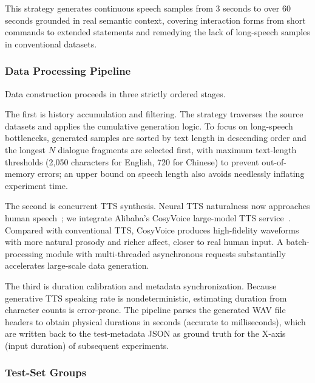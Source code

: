 \documentclass[a4paper,11pt]{article}
\begin{document}
This strategy generates continuous speech samples from 3 seconds to over 60 seconds grounded in real semantic context, covering interaction forms from short commands to extended statements and remedying the lack of long-speech samples in conventional datasets.

\subsubsection{Data Processing Pipeline}

Data construction proceeds in three strictly ordered stages.

The first is history accumulation and filtering. The strategy traverses the source datasets and applies the cumulative generation logic. To focus on long-speech bottlenecks, generated samples are sorted by text length in descending order and the longest $N$ dialogue fragments are selected first, with maximum text-length thresholds (2,050 characters for English, 720 for Chinese) to prevent out-of-memory errors; an upper bound on speech length also avoids needlessly inflating experiment time.

The second is concurrent TTS synthesis. Neural TTS naturalness now approaches human speech~\cite{ref16}; we integrate Alibaba's CosyVoice large-model TTS service~\cite{ref17}. Compared with conventional TTS, CosyVoice produces high-fidelity waveforms with more natural prosody and richer affect, closer to real human input. A batch-processing module with multi-threaded asynchronous requests substantially accelerates large-scale data generation.

The third is duration calibration and metadata synchronization. Because generative TTS speaking rate is nondeterministic, estimating duration from character counts is error-prone. The pipeline parses the generated WAV file headers to obtain physical durations in seconds (accurate to milliseconds), which are written back to the test-metadata JSON as ground truth for the X-axis (input duration) of subsequent experiments.

\subsubsection{Test-Set Groups}
\end{document}
